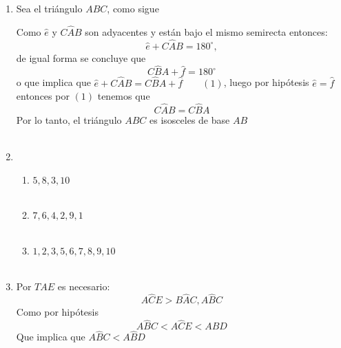 \documentclass[10pt]{article}
\begin{document}
\begin{enumerate}
    
\item Sea el triángulo $ABC$, como sigue 

\begin{center}
\end{center}

    Como $\widehat{e}$ y $C\widehat{A}B$ son adyacentes y están bajo el mismo semirecta entonces: $$\widehat{e} + C\widehat{A}B = 180^{\circ},$$ de igual forma se concluye que $$C\widehat{B}A + \widehat{f} = 180^{\circ}$$ o que implica que $\widehat{e} + C\widehat{A}B = C\widehat{B}A + \widehat{f} \qquad (1)$, luego por hipótesis $\widehat{e} = \widehat{f}$ entonces por $(1)$ tenemos que $$C\widehat{A}B = C\widehat{B}A$$ Por lo tanto, el triángulo $ABC$ es isosceles de base $AB$\\\\

\item 
\begin{enumerate}[\bfseries a)]
    
    \item $5,8,3,10$\\\\

    \item $7,6,4,2,9,1$\\\\

    \item $1,2,3,5,6,7,8,9,10$\\\\

\end{enumerate}

\item Por $TAE$ es necesario: $$A\widehat{C}E > B\widehat{A}C, A\widehat{B}C$$ Como por hipótesis $$A\widehat{B}C < A\widehat{C}E < A \widehat{B}D$$ Que implica que $A\widehat{B}C< A\widehat{B}D$\\\\ 


\end{enumerate}
\end{document}
